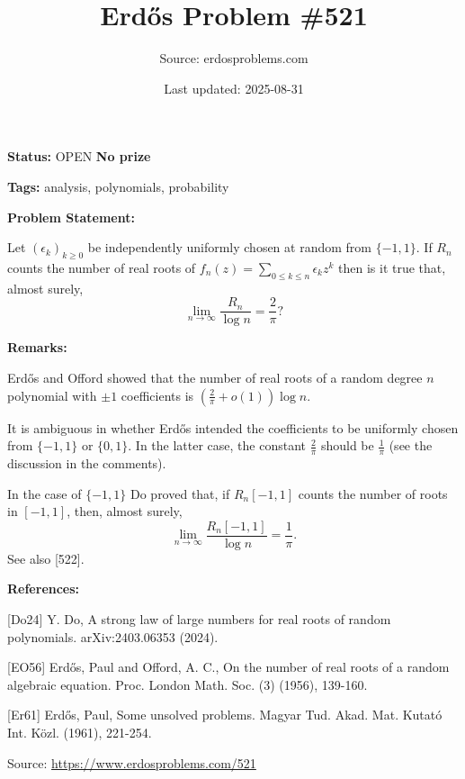 \documentclass{article}
\title{Erd\H{o}s Problem \#521}
\date{Last updated: 2025-08-31}
\author{Source: erdosproblems.com}
\begin{document}
\maketitle

\noindent\textbf{Status:} OPEN \quad \textbf{No prize}

\noindent\textbf{Tags:} analysis, polynomials, probability

\medskip
\noindent\textbf{Problem Statement:}

Let $(\epsilon_k)_{k\geq 0}$ be independently uniformly chosen at random from $\{-1,1\}$. If $R_n$ counts the number of real roots of $f_n(z)=\sum_{0\leq k\leq n}\epsilon_k z^k$ then is it true that, almost surely,\[\lim_{n\to \infty}\frac{R_n}{\log n}=\frac{2}{\pi}?\]

\bigskip
\noindent\textbf{Remarks:}

Erd\H{o}s and Offord \cite{EO56} showed that the number of real roots of a random degree $n$ polynomial with $\pm 1$ coefficients is $(\frac{2}{\pi}+o(1))\log n$.

It is ambiguous in \cite{Er61} whether Erd\H{o}s intended the coefficients to be uniformly chosen from $\{-1,1\}$ or $\{0,1\}$. In the latter case, the constant $\frac{2}{\pi}$ should be $\frac{1}{\pi}$ (see the discussion in the comments).

In the case of $\{-1,1\}$ Do \cite{Do24} proved that, if $R_n[-1,1]$ counts the number of roots in $[-1,1]$, then, almost surely,\[\lim_{n\to \infty}\frac{R_n[-1,1]}{\log n}=\frac{1}{\pi}.\]See also [522].

\bigskip
\noindent\textbf{References:}

[Do24] Y. Do, A strong law of large numbers for real roots of random polynomials. arXiv:2403.06353 (2024).
 
 [EO56] Erd\H{o}s, Paul and Offord, A. C., On the number of real roots of a random algebraic equation. Proc. London Math. Soc. (3) (1956), 139-160.
 
 [Er61] Erd\H{o}s, Paul, Some unsolved problems. Magyar Tud. Akad. Mat. Kutat\'{o} Int. K\"{o}zl. (1961), 221-254.

\bigskip
\noindent\small{Source: \url{https://www.erdosproblems.com/521}}
\end{document}
